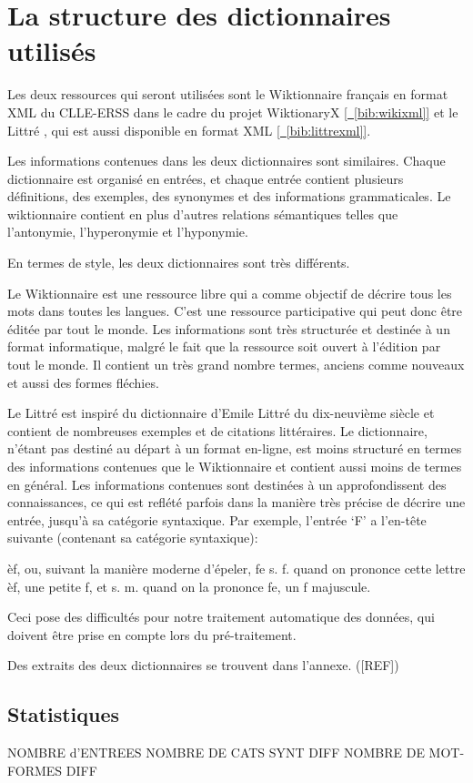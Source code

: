 \section{La structure des dictionnaires utilisés}

Les deux ressources qui seront utilisées sont le Wiktionnaire français en 
format XML du CLLE-ERSS dans le cadre du projet WiktionaryX 
\hyperref[bib:wikixml]{[~\ref*{bib:wikixml}]} et le Littré , qui est aussi 
disponible en format XML \hyperref[bib:littrexml]{[~\ref*{bib:littrexml}]}.

Les informations contenues dans les deux dictionnaires sont similaires. Chaque 
dictionnaire est organisé en entrées, et chaque entrée contient plusieurs 
définitions, des exemples, des synonymes et des informations grammaticales. Le 
wiktionnaire contient en plus d'autres relations sémantiques telles que 
l'antonymie, l'hyperonymie et l’hyponymie.

En termes de style, les deux dictionnaires sont très différents. 

Le Wiktionnaire est une ressource libre qui a comme objectif de décrire tous les mots dans toutes les langues. C'est une ressource participative qui peut donc être éditée par tout le monde. Les informations sont très structurée et destinée à un format informatique, malgré le fait que la ressource soit ouvert à l'édition par tout le monde. Il contient un très grand nombre termes, anciens comme nouveaux et aussi des formes fléchies.

Le Littré est inspiré du dictionnaire d'Emile Littré du dix-neuvième siècle et contient de nombreuses exemples et de citations littéraires. Le dictionnaire, n'étant pas destiné au départ à un format en-ligne, est moins structuré en termes des informations contenues que le Wiktionnaire et contient aussi moins de termes en général. Les informations contenues sont destinées à un approfondissent des connaissances, ce qui est reflété parfois dans la manière très précise de décrire une entrée, jusqu'à sa catégorie syntaxique. Par exemple, l'entrée \lq{F}\rq{} a l'en-tête suivante (contenant sa catégorie syntaxique):

\begin{framed}
\newline
{}\newline
èf, ou, suivant la manière moderne d'épeler, fe 
	 s. f. quand on prononce cette lettre èf, une petite f, et s. m. quand on la prononce fe, un f majuscule. \newline
{}
\end{framed}

Ceci pose des difficultés pour notre traitement automatique des données, qui doivent être prise en compte lors du pré-traitement.

Des extraits des deux dictionnaires se trouvent dans l'annexe. ([REF])

\subsection{Statistiques}

NOMBRE d'ENTREES
NOMBRE DE CATS SYNT DIFF
NOMBRE DE MOT-FORMES DIFF
